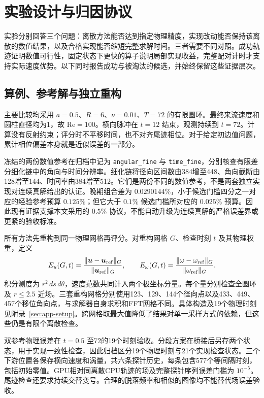 \section{实验设计与归因协议}
\label{sec:validation}

实验分别回答三个问题：离散方法能否达到指定物理精度，实现改动能否保持该离散的数值结果，以及合格实现能否缩短完整求解时间。三者需要不同对照。成功轨迹证明数值可行性，固定状态下更快的算子说明局部实现收益，完整配对计时才支持实际速度优势。以下同时报告成功与被淘汰的候选，并始终保留这些证据层次。

\subsection{算例、参考解与独立重构}

主要比较均采用 $a=0.5$、$R=6$、$\nu=0.01$、$T=72$ 的有限圆环。最终来流速度和圆柱直径均为1，故 $\mathrm{Re}=100$。横向脉冲在 $t=12$ 结束，观测持续到 $t=72$。计算没有反射约束；评分时不平移时间，也不对齐尾迹相位。对于给定初边值问题，累计相位偏差本身就是近似误差的一部分。

冻结的两份数值参考在归档中记为 \texttt{angular\_fine} 与 \texttt{time\_fine}，分别核查有限差分细化链中的角向与时间分辨率。细化链将径向区间数由384增至448、角向截断由128增至144、时间率由384增至512。它们是两份不同的数值参考，不是两套独立实现对连续真解给出的认证。晚期组合差为 $0.0290144\%$，小于候选门槛四分之一对应的经验参考预算 $0.125\%$；但它大于 $0.1\%$ 候选门槛所对应的 $0.025\%$ 预算。因此现有证据支撑本文采用的 $0.5\%$ 协议，不能自动升级为连续真解的严格误差界或更紧的验收标准。

所有方法先重构到同一物理网格再评分。对重构网格 $G$、检查时刻 $t$ 及其物理权重，定义
\begin{equation}
\label{eq:field-errors}
 E_u(G,t)=\frac{\|\boldsymbol u-\boldsymbol u_{\rm ref}\|_G}{\|\boldsymbol u_{\rm ref}\|_G},\qquad
 E_\omega(G,t)=\frac{\|\omega-\omega_{\rm ref}\|_G}{\|\omega_{\rm ref}\|_G}.
\end{equation}
积分测度为 $r^2\,ds\,d\theta$，速度范数共同计入两个极坐标分量。每个量分别检查全圆环及 $r\leq2.5$ 近场。三套重构网格分别使用123、129、144个径向点以及433、449、457个移位角向点，与求解器自身求积和FFT网格不同。具体构造及19个物理时刻见附录~\ref{sec:app-setup}。跨网格取最大值降低了结果对单一采样方式的依赖，但这些仍是有限个离散检查。

双参考物理误差在 $t=0.5$ 至72的19个时刻验收。分段方案在桥接后另存两个状态，用于实现一致性检查，因此归档区分19个物理时刻与21个实现检查状态。三个下游位置各保存横向速度和涡量，共六条探针历史，每条包含577个等间隔时刻，包括初始零值。GPU相对同离散CPU轨迹的场及完整探针序列误差门槛为 $10^{-5}$。尾迹检查还要求持续交替变号。合理的脱落频率和相似的图像均不能替代场误差验收。

